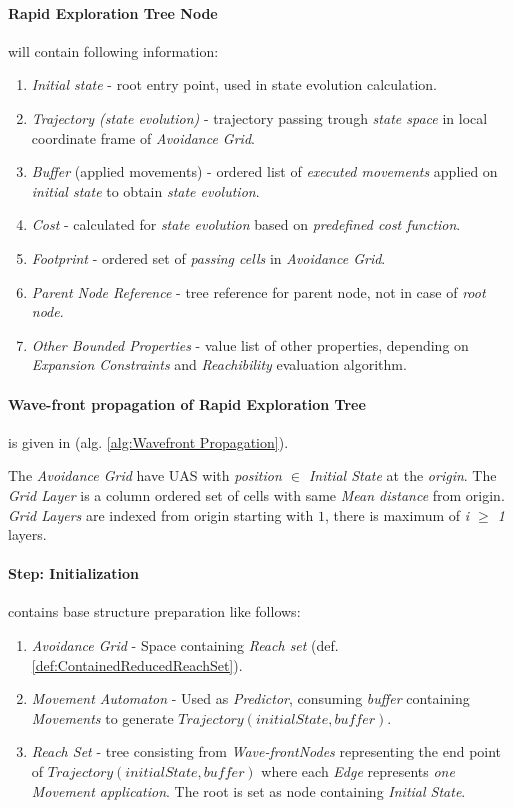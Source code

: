 \paragraph{Rapid Exploration Tree Node} will contain following information:
\begin{enumerate}
    \item \emph{Initial state} - root entry point, used in state evolution calculation.
    \item \emph{Trajectory (state evolution)} - trajectory passing trough \emph{state space} in local coordinate frame of \emph{Avoidance Grid}.
    \item \emph{Buffer} (applied movements) - ordered list of \emph{executed movements} applied on \emph{initial state} to obtain \emph{state evolution}.
    \item \emph{Cost} - calculated for \emph{state evolution} based on \emph{predefined cost function}. 
    \item \emph{Footprint} - ordered set of \emph{passing cells} in \emph{Avoidance Grid}.
    \item \emph{Parent Node Reference} - tree reference for parent node, not in case of \emph{root node}.
    \item \emph{Other Bounded Properties} - value list of other properties, depending on \emph{Expansion Constraints} and \emph{Reachibility} evaluation algorithm.
\end{enumerate}

\paragraph{Wave-front propagation of Rapid Exploration Tree} is given in (alg. \ref{alg:Wavefront Propagation}). 

The \emph{Avoidance Grid} have UAS with \emph{position $\in$ Initial State} at the \emph{origin}. The \emph{Grid Layer} is a column ordered set of cells with same \emph{Mean distance} from origin. \emph{Grid Layers} are indexed from origin starting with $1$, there is maximum of \emph{i $\ge$ 1} layers.

\paragraph{Step: Initialization} contains base structure preparation like follows:
\begin{enumerate}
    \item \emph{Avoidance Grid} - Space containing \emph{Reach set} (def. \ref{def:ContainedReducedReachSet}).
    \item \emph{Movement Automaton} - Used as \emph{Predictor}, consuming \emph{buffer} containing \emph{Movements} to generate $Trajectory(initialState,buffer)$.
    
    \item \emph{Reach Set} -  tree consisting from \emph{Wave-frontNodes} representing the end point of $Trajectory(initialState,buffer)$ where each \emph{Edge} represents \emph{one Movement application}. The root is set as node containing \emph{Initial State}.
\end{enumerate}

